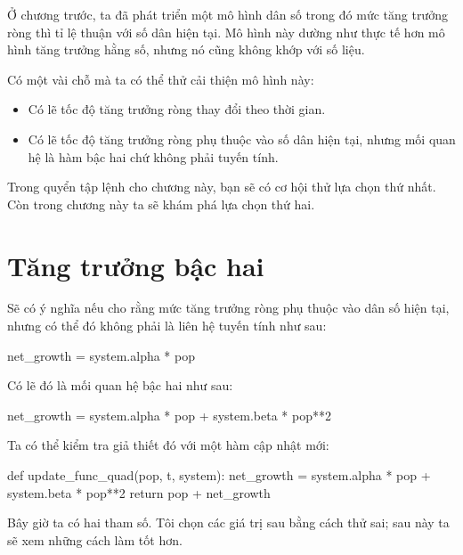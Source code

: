 \documentclass[12pt]{book}
\theoremstyle{exercise}
\begin{document}
Ở chương trước, ta đã phát triển một mô hình dân số trong đó mức tăng trưởng ròng thì tỉ lệ thuận với số dân hiện tại. Mô hình này dường như thực tế hơn mô hình tăng trưởng hằng số, nhưng nó cũng không khớp với số liệu.

Có một vài chỗ mà ta có thể thử cải thiện mô hình này:

\begin{itemize}

\item Có lẽ tốc độ tăng trưởng ròng thay đổi theo thời gian.

\item Có lẽ tốc độ tăng trưởng ròng phụ thuộc vào số dân hiện tại, nhưng mối quan hệ là hàm bậc hai chứ không phải tuyến tính.

\end{itemize}

Trong quyển tập lệnh cho chương này, bạn sẽ có cơ hội thử lựa chọn thứ nhất. Còn trong chương này ta sẽ khám phá lựa chọn thứ hai.


\section{Tăng trưởng bậc hai}
\label{quadratic}

Sẽ có ý nghĩa nếu cho rằng mức tăng trưởng ròng phụ thuộc vào dân số hiện tại, nhưng có thể đó không phải là liên hệ tuyến tính như sau:

\begin{python}
    net_growth = system.alpha * pop
\end{python}

Có lẽ đó là mối quan hệ bậc hai như sau:


\begin{python}
    net_growth = system.alpha * pop + system.beta * pop**2
\end{python}

Ta có thể kiểm tra giả thiết đó với một hàm cập nhật mới:

\begin{python}
def update_func_quad(pop, t, system):
    net_growth = system.alpha * pop + system.beta * pop**2
    return pop + net_growth
\end{python}

Bây giờ ta có hai tham số. Tôi chọn các giá trị sau bằng cách thử sai; sau này ta sẽ xem những cách làm tốt hơn.

\end{document}
